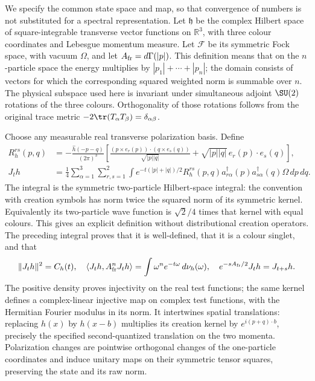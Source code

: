We specify the common state space and map, so that convergence of
numbers is not substituted for a spectral representation. Let
$\mathfrak h$ be the complex Hilbert space of square-integrable
transverse vector functions on $\mathbb R^3$, with three colour
coordinates and Lebesgue momentum measure. Let $\mathcal F$ be
its symmetric Fock space, with vacuum $\Omega$, and let
$A_{\rm fr}=d\Gamma(|p|)$. This definition means that on the
$n$-particle space the energy multiplies by
$|p_1|+\cdots+|p_n|$; the domain consists of vectors for which
the corresponding squared weighted norm is summable over $n$.
The physical subspace used here is invariant under simultaneous
adjoint $\SU(2)$ rotations of the three colours. Orthogonality
of those rotations follows from the original trace metric
$-2\tr(T_\alpha T_\beta)=\delta_{\alpha\beta}$.

Choose any measurable real transverse polarization basis. Define
\begin{align}
 R_h^{rs}(p,q)&=-\frac{\widehat h(-p-q)}{(2\pi)^3}
 \left[\frac{(p\times e_r(p))\cdot(q\times e_s(q))}{\sqrt{|p||q|}}
       +\sqrt{|p||q|}\,e_r(p)\cdot e_s(q)\right],\nonumber\\
 J_t h&=\frac14\sum_{\alpha=1}^3\sum_{r,s=1}^2
 \int e^{-t(|p|+|q|)/2}R_h^{rs}(p,q)
    a^\dagger_{r\alpha}(p)a^\dagger_{s\alpha}(q)\Omega\,dp\,dq.
 \label{eq:full-state-map}
\end{align}
The integral is the symmetric two-particle Hilbert-space integral:
the convention with creation symbols has norm twice the squared
norm of its symmetric kernel. Equivalently its two-particle wave
function is $\sqrt2/4$ times that kernel with equal colours.
This gives an explicit definition without distributional creation
operators. The preceding integral proves that it is well-defined,
that it is a colour singlet, and that
\[
 \|J_t h\|^2=C_h(t),\quad
 \langle J_t h,A_{\rm fr}^nJ_t h\rangle
       =\int\omega^n e^{-t\omega}\,d\nu_h(\omega),\quad
 e^{-sA_{\rm fr}/2}J_t h=J_{t+s}h.
\]
The positive density proves injectivity on the real test functions;
the same kernel defines a complex-linear injective map on complex
test functions, with the Hermitian Fourier modulus in its norm.
It intertwines spatial translations: replacing $h(x)$ by $h(x-b)$
multiplies its creation kernel by $e^{i(p+q)\cdot b}$, precisely
the specified second-quantized translation on the two momenta.
Polarization changes are pointwise orthogonal changes of the
one-particle coordinates and induce unitary maps on their symmetric
tensor squares, preserving the state and its raw norm.

